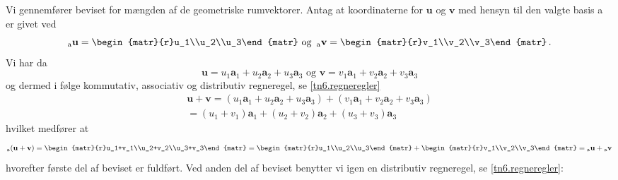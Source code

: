 \begin{bevis}
Vi gennemfører beviset for mængden af de geometriske rumvektorer. Antag at koordinaterne for $\mathbf u$ og $\mathbf v$ med hensyn til den valgte basis a er givet ved
\begin{equation}
_\mathrm{a}\mathbf{u}=\begin{matr}{r}u_1\\u_2\\u_3\end{matr}
\,\,\mathrm{og}\,\,\,
_\mathrm{a}\mathbf{v}=\begin{matr}{r}v_1\\v_2\\v_3\end{matr}\,.
\end{equation}
Vi har da
\begin{equation}
\mathbf{u}=u_1\mathbf a_1+u_2\mathbf a_2+u_3\mathbf a_3
\,\,\mathrm{og}\,\,
\mathbf{v}=v_1\mathbf a_1+v_2\mathbf a_2+v_3\mathbf a_3
\end{equation}
og dermed i følge kommutativ, associativ og distributiv regneregel, se \ref{tn6.regneregler}
\begin{equation}
\begin{array}{c}
\mathbf{u}+\mathbf{v}=(u_1\mathbf a_1+u_2\mathbf a_2+u_3\mathbf a_3)+
(v_1\mathbf a_1+v_2\mathbf a_2+v_3\mathbf a_3)\\
=(u_1+v_1)\mathbf a_1+(u_2+v_2)\mathbf a_2+(u_3+v_3)\mathbf a_3
\end{array}
\end{equation}
hvilket medfører at
\begin{equation}
_\mathrm a(\mathbf u+\mathbf v)= \begin{matr}{r}u_1+v_1\\u_2+v_2\\u_3+v_3\end{matr}=
\begin{matr}{r}u_1\\u_2\\u_3\end{matr}
+\begin{matr}{r}v_1\\v_2\\v_3\end{matr}= {_\mathrm{a}\mathbf{u}}+{_\mathrm{a}\mathbf{v}}
\end{equation}
hvorefter første del af beviset er fuldført. Ved anden del af beviset benytter vi igen en distributiv regneregel, se \ref{tn6.regneregler}:\\
\begin{equation}

\end{equation}
\end{bevis}
